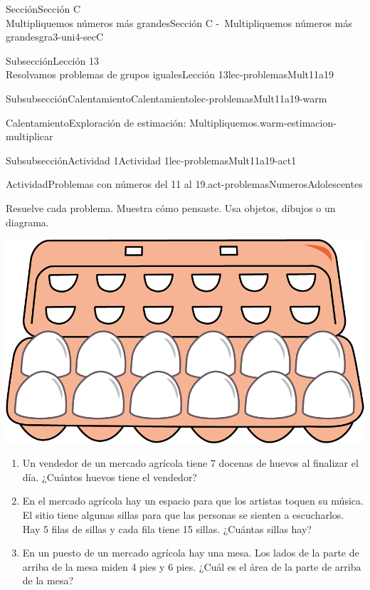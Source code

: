 \begin{sectionptx}{Sección}{{\Large Sección C\\}Multipliquemos números más grandes}{}{Sección C -~Multipliquemos números más grandes}{}{}{gra3-uni4-secC}
\begin{subsectionptx}{Subsección}{{\normalsize Lección 13\\[-0.05cm]}Resolvamos problemas de grupos iguales}{}{Lección 13}{}{}{lec-problemasMult11a19}
\begin{subsubsectionptx}{Subsubsección}{Calentamiento}{}{Calentamiento}{}{}{lec-problemasMult11a19-warm}
\begin{exploration}{Calentamiento}{Exploración de estimación: Multipliquemos.}{warm-estimacion-multiplicar}
\end{exploration}%
\end{subsubsectionptx}
%
%
\typeout{************************************************}
\typeout{************************************************}
%
\vspace{-0.2cm}
\begin{subsubsectionptx}{Subsubsección}{Actividad 1}{}{Actividad 1}{}{}{lec-problemasMult11a19-act1}
\begin{activity}{Actividad}{Problemas con números del 11 al 19.}{act-problemasNumerosAdolescentes}%
\begin{sidebyside}{2}{0.05}{0.05}{0.1}%
\begin{sbspanel}{0.5}%
Resuelve cada problema. Muestra cómo pensaste. Usa objetos, dibujos o un diagrama.%
\end{sbspanel}%
\begin{sbspanel}{0.3}%
\includegraphics[max width=0.7\linewidth, center]{external/png-source/egg_carton.png}
\end{sbspanel}%
\end{sidebyside}%
%
\begin{enumerate}
\item{}Un vendedor de un mercado agrícola tiene 7 docenas de huevos al finalizar el día. ¿Cuántos huevos tiene el vendedor?%
\item{}En el mercado agrícola hay un espacio para que los artistas toquen su música. El sitio tiene algunas sillas para que las personas se sienten a escucharlos. Hay 5 filas de sillas y cada fila tiene 15 sillas. ¿Cuántas sillas hay?%
\item{}En un puesto de un mercado agrícola hay una mesa. Los lados de la parte de arriba de la mesa miden 4 pies y 6 pies. ¿Cuál es el área de la parte de arriba de la mesa?%
\end{enumerate}
\end{activity}%
\end{subsubsectionptx}
%
%
\typeout{************************************************}

\end{subsectionptx}
\end{sectionptx}
